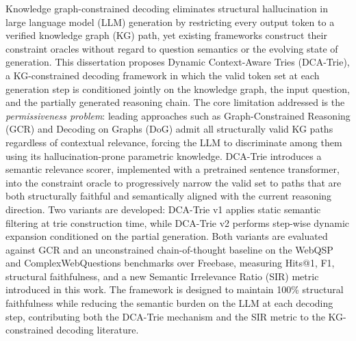 
\begin{abstracts}

    Knowledge graph-constrained decoding eliminates structural hallucination in large language model (LLM) generation by restricting every output token to a verified knowledge graph (KG) path, yet existing frameworks construct their constraint oracles without regard to question semantics or the evolving state of generation.
    This dissertation proposes Dynamic Context-Aware Tries (DCA-Trie), a KG-constrained decoding framework in which the valid token set at each generation step is conditioned jointly on the knowledge graph, the input question, and the partially generated reasoning chain.
    The core limitation addressed is the \emph{permissiveness problem}: leading approaches such as Graph-Constrained Reasoning (GCR) and Decoding on Graphs (DoG) admit all structurally valid KG paths regardless of contextual relevance, forcing the LLM to discriminate among them using its hallucination-prone parametric knowledge.
    DCA-Trie introduces a semantic relevance scorer, implemented with a pretrained sentence transformer, into the constraint oracle to progressively narrow the valid set to paths that are both structurally faithful and semantically aligned with the current reasoning direction.
    Two variants are developed: DCA-Trie v1 applies static semantic filtering at trie construction time, while DCA-Trie v2 performs step-wise dynamic expansion conditioned on the partial generation.
    Both variants are evaluated against GCR and an unconstrained chain-of-thought baseline on the WebQSP and ComplexWebQuestions benchmarks over Freebase, measuring Hits@1, F1, structural faithfulness, and a new Semantic Irrelevance Ratio (SIR) metric introduced in this work.
    The framework is designed to maintain 100\% structural faithfulness while reducing the semantic burden on the LLM at each decoding step, contributing both the DCA-Trie mechanism and the SIR metric to the KG-constrained decoding literature.

\end{abstracts}
